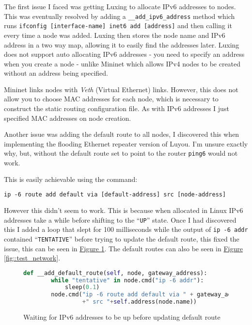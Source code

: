 \documentclass[12pt,a4paper,twoside,openany]{report}
\begin{document}
\bigskip

The first issue I faced was getting Luxing to allocate IPv6 addresses to nodes. This was eventually resolved by adding a \verb!__add_ipv6_address! method which runs \verb!ifconfig [interface-name] inet6 add [address]! and then calling it every time a node was added. Luxing then stores the node name and IPv6 address in a two way map, allowing it to easily find the addresses later. Luxing does not support auto allocating IPv6 addresses - you need to specify an address when you create a node - unlike Mininet which allows IPv4 nodes to be created without an address being specified.

\bigskip

Mininet links nodes with \textit{Veth} (Virtual Ethernet) links. However, this does not allow you to choose MAC addresses for each node, which is necessary to construct the static routing configuration file. As with IPv6 addresses I just specified MAC addresses on node creation.

\bigskip

Another issue was adding the default route to all nodes, I discovered this when implementing the flooding Ethernet repeater version of Luyou.  I'm unsure exactly why, but, without the default route set to point to the router \verb!ping6! would not work. 

This is easily achievable using the command:

\verb!ip -6 route add default via [default-address] src [node-address]! 

However this didn't seem to work.  This is because when allocated in Linux IPv6 addresses take a while before shifting to the ``\verb!UP!'' state.  Once I had discovered this I added a loop that slept for 100 milliseconds while the output of \verb!ip -6 addr! contained ``\verb!TENTATIVE!'' before trying to update the default route, this fixed the issue, this can be seen in \hyperref[fig::tentative]{Figure }\ref{fig::tentative}.  The default routes can also be seen in \hyperref[fig::test_network]{Figure }\ref{fig::test_network}.


\begin{figure}
\begin{lstlisting}[language=Python]
def __add_default_route(self, node, gateway_address):
        while "tentative" in node.cmd("ip -6 addr"):
            sleep(0.1)
        node.cmd("ip -6 route add default via " + gateway_address 
                 +" src "+self.address(node.name))
\end{lstlisting}
\caption{Waiting for IPv6 addresses to be up before updating default route}
\label{fig::tentative}
\end{figure}
\end{document}

